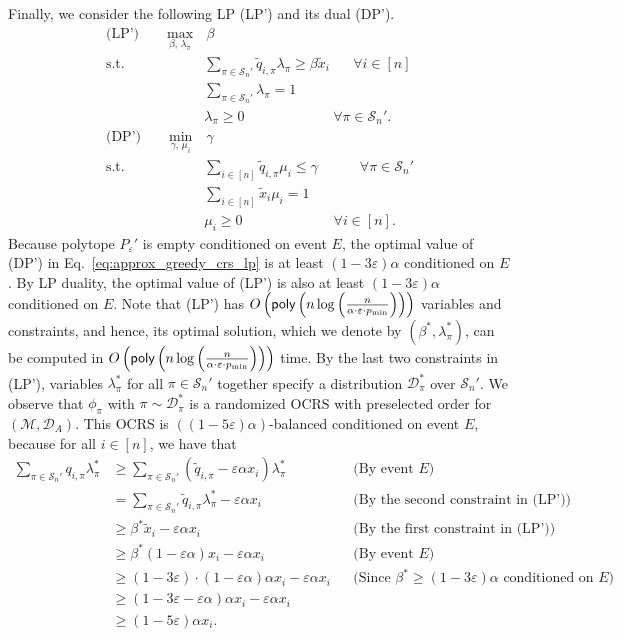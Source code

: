 \documentclass[11pt]{article}
\newcommand{\D}{\mathcal D}
\newcommand{\M}{{\mathcal M}}
\newcommand{\cS}{{\mathcal S}}
\newcommand{\eps}{\varepsilon}
\newcommand{\poly}{\textnormal{\sffamily poly}}
\begin{document}
Finally, we consider the following LP (LP') and its dual (DP').
\begin{align}\label{eq:approx_greedy_crs_lp}
    \textrm{(LP')}\qquad\max_{\beta,\,\lambda_{\pi}}&\,\beta\nonumber\\
    \textrm{s.t. }& \sum_{\pi\in\cS_n'} \tilde{q}_{i,\pi}\lambda_{\pi}\ge\beta \tilde{x}_i \quad\,\,\,\,\forall i\in [n]\nonumber\\
    & \sum_{\pi\in\cS_n'}\lambda_{\pi}=1\nonumber\\
    & \lambda_{\pi}\ge 0 \qquad\qquad\qquad\,\,\forall\pi\in\cS_n'.\nonumber\\
    \textrm{(DP')}\qquad\min_{\gamma,\,\mu_i}&\,\gamma\nonumber\\
    \textrm{s.t. }& \sum_{i\in[n]} \tilde{q}_{i,\pi}\mu_i\le\gamma \qquad\,\,\,\,\,\,\forall\pi\in\cS_n'\nonumber\\
    & \sum_{i\in[n]}\tilde{x}_i\mu_i=1\nonumber\\
    & \mu_i\ge 0 \qquad\qquad\qquad\,\,\,\forall i\in [n].
\end{align}
Because polytope $P_{\eps}'$ is empty conditioned on event $E$, the optimal value of (DP') in Eq.~\eqref{eq:approx_greedy_crs_lp} is at least $(1-3\eps)\alpha$ conditioned on $E$. By LP duality, the optimal value of (LP') is also at least $(1-3\eps)\alpha$ conditioned on $E$. Note that (LP') has $O\left(\poly\left(n\log\left(\frac{n}{\alpha\cdot\eps\cdot p_{\min}}\right)\right)\right)$ variables and constraints, and hence, its optimal solution, which we denote by $(\beta^*,\lambda_{\pi}^*)$, can be computed in $O\left(\poly\left(n\log\left(\frac{n}{\alpha\cdot\eps\cdot p_{\min}}\right)\right)\right)$ time. By the last two constraints in (LP'), variables $\lambda_{\pi}^*$ for all $\pi\in\cS_n'$ together specify a distribution $\D_{\pi}^*$ over $\cS_n'$. We observe that $\phi_{\pi}$ with $\pi\sim\D_{\pi}^*$ is a randomized OCRS with preselected order for $(\M,\D_A)$. This OCRS is $((1-5\eps)\alpha)$-balanced conditioned on event $E$, because for all $i\in[n]$, we have that
\begin{align*}
\sum_{\pi\in\cS_n'}q_{i,\pi}\lambda_{\pi}^*&\ge\sum_{\pi\in\cS_n'} (\tilde{q}_{i,\pi}-\eps\alpha x_i)\lambda_{\pi}^* &&\text{(By event $E$)}\\
&=\sum_{\pi\in\cS_n'}\tilde{q}_{i,\pi}\lambda_{\pi}^*-\eps\alpha x_i &&\text{(By the second constraint in (LP'))}\\
&\ge\beta^*\tilde{x}_i-\eps\alpha x_i&&\text{(By the first constraint in (LP'))}\\
&\ge\beta^*(1-\eps\alpha)x_i-\eps\alpha x_i&&\text{(By event $E$)}\\
&\ge(1-3\eps)\cdot(1-\eps\alpha)\alpha x_i-\eps\alpha x_i&&\text{(Since $\beta^*\ge(1-3\eps)\alpha$ conditioned on $E$)}\\
&\ge(1-3\eps-\eps\alpha)\alpha x_i-\eps\alpha x_i\\
&\ge(1-5\eps)\alpha x_i.
\end{align*}
\end{document}
